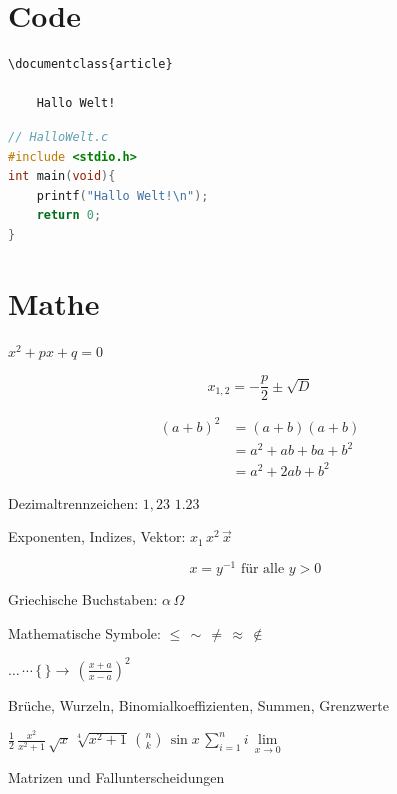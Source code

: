 \section{Code}

\begin{lstlisting}[language={[LaTeX]TeX}]
% HalloWelt.tex
\documentclass{article}

	Hallo Welt!

\end{lstlisting}

\begin{lstlisting}[language={C}]
// HalloWelt.c
#include <stdio.h>
int main(void){
	printf("Hallo Welt!\n");
	return 0;
}
\end{lstlisting}

\section*{Mathe}
 
 $x^{2} + px + q = 0$

\begin{equation}
 x_{1,2} = -\frac{p}{2} \pm \sqrt{D}
\end{equation}
 
\begin{align*}
(a+b)^{2}  &= (a+b) (a+b) \\
                &= a^{2} + ab + ba + b^{2} \\
                &= a^{2} + 2ab + b^{2}
\end{align*}

Dezimaltrennzeichen: $1,23$ $1.23$

Exponenten, Indizes, Vektor: $x_{1} \,  x^{2} \, \vec{x}$

\begin{equation}
x = y^{-1} \text{ für alle $y > 0$ }
\end{equation}

Griechische Buchstaben: $\alpha \, \Omega$

Mathematische Symbole: $\le \, \sim \, \ne \, \approx \, \notin$

$\ldots \, \cdots \, \{ \, \} \rightarrow \, \left( \frac{x+a}{x-a} \right)^2$

Brüche, Wurzeln, Binomialkoeffizienten, Summen, Grenzwerte

$\frac{1}{2} \, \frac{x^2}{x^2+1} \, \sqrt{x} \, \sqrt[4]{x^2+1} \, \binom{n}{k} \, \sin x \, \sum\limits_{i=1}^{n} i \, \lim\limits_{x \to 0}$

Matrizen und Fallunterscheidungen

